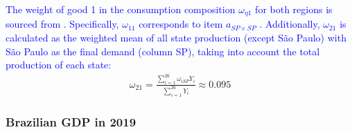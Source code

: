 \documentclass[../thesis.tex]{subfiles}
\begin{document}
\textcolor{blue}{The weight of good 1 in the consumption composition $\omega_{\eta 1}$ for both regions is sourced from \textcite[Table 3, p.442]{haddad_matriz_2017}. Specifically, $\omega_{11}$ corresponds to item $a_{SP\times SP}$ \label{eq:omega-e1}. Additionally, $\omega_{21}$ is calculated as the weighted mean of all state production (except São Paulo) with São Paulo as the final demand (column SP), taking into account the total production of each state:}
\begin{align}
	\omega_{21} = \frac{\sum_{i=1}^{26} \omega_{iSP} Y_i}{\sum_{i=1}^{26} Y_i} \approx 0.095 \label{eq:omega-e2}
\end{align}

\newpage


\subsubsection{Brazilian GDP in 2019}

\vspace*{0.3cm}
\end{document}
